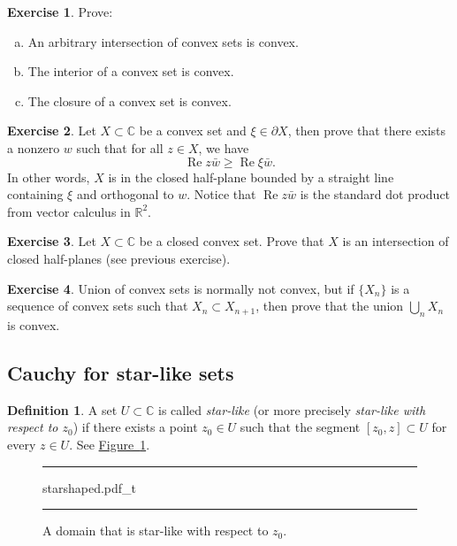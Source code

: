\documentclass[12pt,openany]{book}
\renewcommand{\Re}{\operatorname{Re}}
\newcommand{\C}{{\mathbb{C}}}
\newcommand{\R}{{\mathbb{R}}}
\newcommand{\myindex}[1]{#1\index{#1}}
\theoremstyle{plain}
\theoremstyle{remark}
\theoremstyle{definition}
\newtheorem{defn}[thm]{Definition}
\newenvironment{exbox}{%
    \def\FrameCommand{\vrule width 1pt \relax\hspace{10pt}}%
    \MakeFramed{\advance\hsize-\width\FrameRestore}%
}{%
    \endMakeFramed
}
\newenvironment{exparts}{%
    \leavevmode\begin{enumerate}[a),noitemsep,topsep=0pt,parsep=0pt,partopsep=0pt]
}{%
    \end{enumerate}
}
\newenvironment{myfig}{%
\begin{figure}[h!t]
\noindent\rule{\textwidth}{0.5pt}\vspace{12pt}\par\centering}%
{\par\noindent\rule{\textwidth}{0.5pt}
\end{figure}}
\theoremstyle{exercise}
\newtheorem{exercise}{Exercise}[section]
\theoremstyle{example}
\newcommand{\figureref}[1]{\hyperref[#1]{Figure~\ref*{#1}}}
\begin{document}
\begin{exbox}
\begin{exercise}
Prove:
\begin{exparts}
\item
An arbitrary intersection of convex sets is convex.
\item
The interior of a convex set is convex.
\item
The closure of a convex set is convex.
\end{exparts}
\end{exercise}

\begin{exercise}
Let $X \subset \C$ be a convex set and $\xi \in \partial X$, then prove that
there exists a nonzero $w$ such that for all $z \in X$, we have
\begin{equation*}
\Re z\bar{w} \geq \Re \xi\bar{w} .
\end{equation*}
In other words, $X$ is in the closed half-plane
bounded by a straight line containing $\xi$ and
orthogonal to $w$.
Notice that $\Re z\bar{w}$ is the standard dot product from
vector calculus in $\R^2$.
\end{exercise}

\begin{exercise}
Let $X \subset \C$ be a closed convex set.
Prove that $X$ is an intersection of closed half-planes (see previous
exercise).
\end{exercise}

\begin{exercise}
Union of convex sets is normally not convex, but if $\{ X_n \}$ is a
sequence of convex sets such that $X_n \subset X_{n+1}$, then
prove that the union $\bigcup_n X_n$ is convex.
\end{exercise}
\end{exbox}

\subsection{Cauchy for star-like sets}

\begin{defn}
A set $U \subset \C$ is called \emph{\myindex{star-like}} (or more precisely
\emph{star-like with respect to $z_0$}) if there exists a
point $z_0 \in U$ such that the segment $[z_0,z] \subset U$ for every
$z \in U$.  See \figureref{fig:starshaped}.
\end{defn}

\begin{myfig}
{starshaped.pdf_t}
\caption{A domain that is star-like with respect to $z_0$.\label{fig:starshaped}}
\end{myfig}
\end{document}
